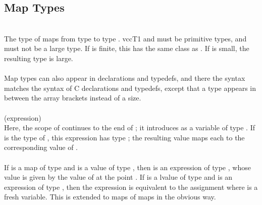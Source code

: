 \documentclass[preprint,nocopyrightspace]{sigplanconf}
\begin{document}
{{\subsection{Map Types}
\\
The type of maps from type  to type . 
vcc{T1} and  must be primitive types, and  must
not be a large type. If  is finite, this has the same class
as . If  is small, the resulting type is large.
\\\\
Map types can also appear in
declarations and typedefs, and there the syntax matches the syntax of
C declarations and typedefs, except that a type appears in between the
array brackets instead of a size.
\\\\
 (expression)\\
Here, the scope of  continues to the end of ; it
introduces  as a variable of type . 
If  is the
type of , this expression has type ; the resulting
value maps each  to the corresponding value of .
\\\\
If  is a map of
type  and  is a value of type ,
then  is an expression of type , whose value is
given by the value of  at the point . If  is a
lvalue of type  and  is an expression of
type , then the expression  is equivalent to
the assignment 
where  is a fresh variable. This is extended to maps of maps in
the obvious way.

}}
\end{document}
